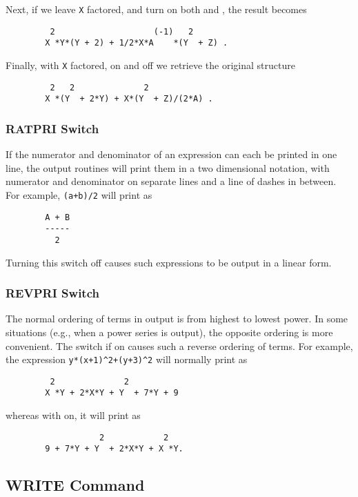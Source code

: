 Next, if we leave \texttt{X} factored, and turn on both  and
, the result becomes
\begin{verbatim}
         2                    (-1)   2
        X *Y*(Y + 2) + 1/2*X*A    *(Y  + Z) .
\end{verbatim}
Finally, with \texttt{X} factored,  on and 
off we retrieve the original structure
\begin{verbatim}
         2   2              2
        X *(Y  + 2*Y) + X*(Y  + Z)/(2*A) .
\end{verbatim}

\subsubsection{RATPRI Switch}
\hypertarget{switch:RATPRI}{}

If the numerator and denominator of an expression can each be printed in
one line, the output routines will print them in a two dimensional
notation, with numerator and denominator on separate lines and a line of
dashes in between. For example, \texttt{(a+b)/2} will print as
\begin{verbatim}
        A + B
        -----
          2
\end{verbatim}
Turning this switch off causes such expressions to be output in a linear
form.

\subsubsection{REVPRI Switch}
\hypertarget{switch:REVPRI}{}

The normal ordering of terms in output is from highest to lowest power.
In some situations (e.g., when a power series is output), the opposite
ordering is more convenient.  The switch  if on causes such a
reverse ordering of terms.  For example, the expression
\texttt{y*(x+1)\textasciicircum2+(y+3)\textasciicircum2} will normally print as
\begin{verbatim}
         2              2
        X *Y + 2*X*Y + Y  + 7*Y + 9
\end{verbatim}
whereas with  on, it will print as
\begin{verbatim}
                   2            2
        9 + 7*Y + Y  + 2*X*Y + X *Y.
\end{verbatim}

\hypertarget{command:WRITE}{\subsection{WRITE Command}}

